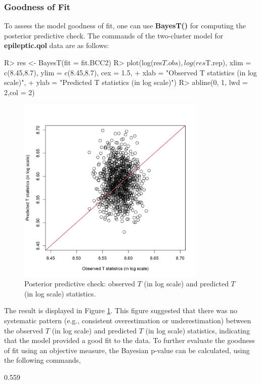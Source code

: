 \subsubsection{Goodness of Fit}
To assess the model goodness of fit, one can use \textbf{BayesT()} for computing the posterior predictive check. The commands of the two-cluster model for \textbf{epileptic.qol} data are as follows: 
\begin{example}
R> res <- BayesT(fit = fit.BCC2)
R> plot(log(res$T.obs), log(res$T.rep), xlim = c(8.45,8.7), ylim = c(8.45,8.7), cex = 1.5,
+        xlab = "Observed T statistics (in log scale)", 
+        ylab = "Predicted T statistics (in log scale)")
R> abline(0, 1, lwd = 2,col = 2)
\end{example} 
\begin{figure}[h]
\centering
\includegraphics[width=9cm,height=9cm]{./Figures/posterior_check.JPEG}
\caption{\label{fig:posterior_check}  Posterior predictive check: observed $T$ (in log scale) and predicted $T$ (in log scale) statistics.}
\end{figure}
The result is displayed in Figure \ref{fig:posterior_check}. This figure suggested that there was no systematic pattern (e.g., consistent overestimation or underestimation) between the observed $T$ (in log scale) and predicted $T$ (in log scale) statistics, indicating that the model provided a good fit to the data. To further evaluate the goodness of fit using an objective measure, the Bayesian p-value can be calculated, using the following commands,
\begin{example}
[1] 0.559
\end{example}
